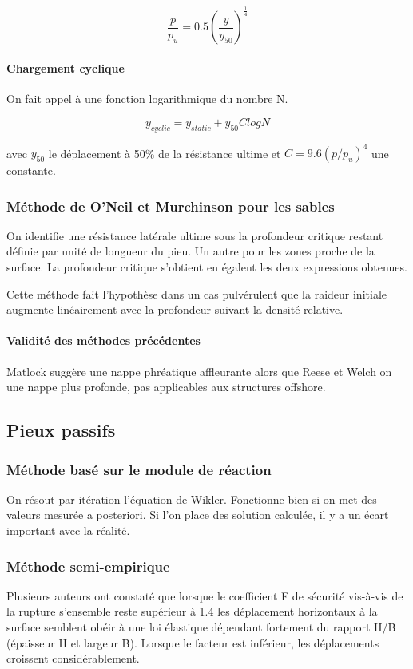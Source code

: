 $$ \frac{p}{p_u} = 0.5 (\frac{y}{y_50})^\frac{1}{4} $$

\paragraph{Chargement cyclique}

On fait appel à une fonction logarithmique du nombre N.

$$y_{cyclic} = y_{static} + y_{50} C log N $$

avec $y_{50}$ le déplacement à 50\% de la résistance ultime et $C=9.6(p/p_u)^4$ une constante.

\subsubsection{Méthode de O'Neil et Murchinson pour les sables}

On identifie une résistance latérale ultime sous la profondeur critique restant définie par unité de longueur du pieu. Un autre pour les zones proche de la surface. La profondeur critique s'obtient en égalent les deux expressions obtenues.

Cette méthode fait l'hypothèse dans un cas pulvérulent que la raideur initiale augmente linéairement avec la profondeur suivant la densité relative.

\paragraph{Validité des méthodes précédentes}

Matlock suggère une nappe phréatique affleurante alors que Reese et Welch on une nappe plus profonde, pas applicables aux structures offshore. 

\subsection{Pieux passifs}

\subsubsection{Méthode basé sur le module de réaction}

On résout par itération l'équation de Wikler. Fonctionne bien si on met des valeurs mesurée a posteriori. Si l'on place des solution calculée, il y a un écart important avec la réalité.

\subsubsection{Méthode semi-empirique}

Plusieurs auteurs ont constaté que lorsque le coefficient F de sécurité vis-à-vis de la rupture s'ensemble reste supérieur à 1.4 les déplacement horizontaux à la surface semblent obéir à une loi élastique dépendant fortement du rapport H/B (épaisseur H et largeur B). Lorsque le facteur est inférieur, les déplacements croissent considérablement.
